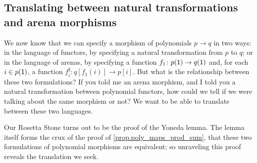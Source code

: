 \documentclass[Book-Poly]{subfiles}
\begin{document}

\subsection{Translating between natural transformations and arena morphisms} \label{subsec.poly.func_nat.morph.translate}
We now know that we can specify a morphism of polynomials $p \to q$ in two ways: in the language of functors, by specifying a natural transformation from $p$ to $q$; or in the language of arenas, by specifying a function $f_1 \colon p(\textsf{1}) \to q(\textsf{1})$ and, for each $i \in p(\textsf{1})$, a function $f^\sharp_i \colon q[f_1(i)] \to p[i]$.
But what is the relationship between these two formulations?
If you told me an arena morphism, and I told you a natural transformation between polynomial functors, how could we tell if we were talking about the same morphism or not?
We want to be able to translate between these two languages.

Our Rosetta Stone turns out to be the proof of the Yoneda lemma.
The lemma itself forms the crux of the proof of \cref{prop.poly_maps_prod_sum}, that these two formulations of polynomial morphisms are equivalent; so unraveling this proof reveals the translation we seek.
\end{document}
